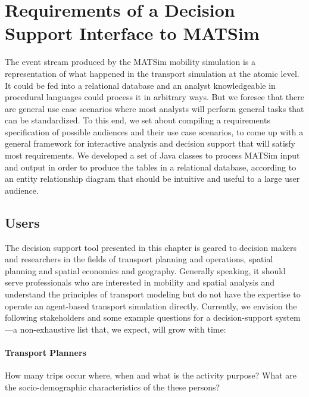 \section{Requirements of a Decision Support Interface to MATSim}
\label{sec:analyticsRequirements}
The event stream produced by the MATSim mobility simulation is a representation of what happened in the transport simulation at the atomic level. It could be fed into a relational database and an analyst knowledgeable in procedural languages could process it in arbitrary ways. But we foresee that there are general use case scenarios where most analysts will perform general tasks that can be standardized. To this end, we set about compiling a requirements specification of possible audiences and their use case scenarios, to come up with a general framework for interactive analysis and decision support that will satisfy most requirements. We developed a set of Java classes to process MATSim input and output in order to produce the tables in a relational database, according to an entity relationship diagram that should be intuitive and useful to a large user audience.

\subsection{Users}
The decision support tool presented in this chapter is geared to decision makers and researchers
in the fields of transport planning and operations, spatial planning and spatial economics and
geography. Generally speaking, it should serve professionals who are interested in mobility
and spatial analysis and understand the principles of transport modeling but do not have the
expertise to operate an agent-based transport simulation directly. Currently, we envision the
following stakeholders and some example questions for a decision-support system---a non-exhaustive list that, we expect, will grow with time:
\paragraph{Transport Planners}
How many trips occur where, when and what is the activity purpose?
What are the socio-demographic characteristics of the these persons?
